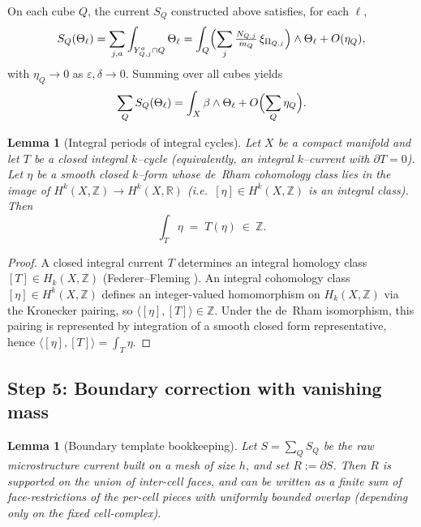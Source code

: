 \documentclass[11pt]{article}
\numberwithin{equation}{section}  %
\theoremstyle{plain}
\newtheorem{lemma}[theorem]{Lemma}
\theoremstyle{definition}
\theoremstyle{remark}
\newcommand{\R}{\mathbb{R}}
\newcommand{\Z}{\mathbb{Z}}
\begin{document}
On each cube $Q$, the current $S_Q$ constructed above satisfies, for
each $\ell$,
\[
S_Q(\Theta_\ell)
= \sum_{j,a} \int_{Y_{Q,j}^a\cap Q} \Theta_\ell
= \int_Q \Bigl(\sum_{j}\tfrac{N_{Q,j}}{m_Q}\,\xi_{\Pi_{Q,j}}\Bigr)
  \wedge \Theta_\ell + O(\eta_Q),
\]
with $\eta_Q\to 0$ as $\varepsilon,\delta\to 0$.  Summing over all cubes yields
\[
\sum_Q S_Q(\Theta_\ell)
= \int_X \beta\wedge \Theta_\ell + O\Bigl(\sum_Q \eta_Q\Bigr).
\]



\begin{lemma}[Integral periods of integral cycles]\label{lem:integral-periods}
Let $X$ be a compact manifold and let $T$ be a closed integral $k$--cycle (equivalently, an integral $k$--current with $\partial T=0$).
Let $\eta$ be a smooth closed $k$--form whose de~Rham cohomology class lies in the image of
$H^{k}(X,\Z)\to H^{k}(X,\R)$ (i.e.\ $[\eta]\in H^{k}(X,\Z)$ is an integral class).
Then
\[
\int_{T}\eta \;=\; T(\eta)\ \in\ \Z.
\]
\end{lemma}

\begin{proof}
A closed integral current $T$ determines an integral homology class $[T]\in H_{k}(X,\Z)$ (Federer--Fleming
).
An integral cohomology class $[\eta]\in H^{k}(X,\Z)$ defines an integer-valued homomorphism on $H_{k}(X,\Z)$ via the Kronecker pairing,
so $\langle [\eta],[T]\rangle\in\Z$.
Under the de~Rham isomorphism, this pairing is represented by integration of a smooth closed form representative, hence
$\langle [\eta],[T]\rangle=\int_{T}\eta$.
\end{proof}






\subsection*{Step 5: Boundary correction with vanishing mass}


\begin{lemma}[Boundary template bookkeeping]\label{lem:boundary-template}
Let $S=\sum_Q S_Q$ be the raw microstructure current built on a mesh of size $h$, and set $R:=\partial S$.
Then $R$ is supported on the union of inter-cell faces, and can be written as a finite sum of face-restrictions
of the per-cell pieces with uniformly bounded overlap (depending only on the fixed cell-complex).
\end{lemma}
\end{document}
